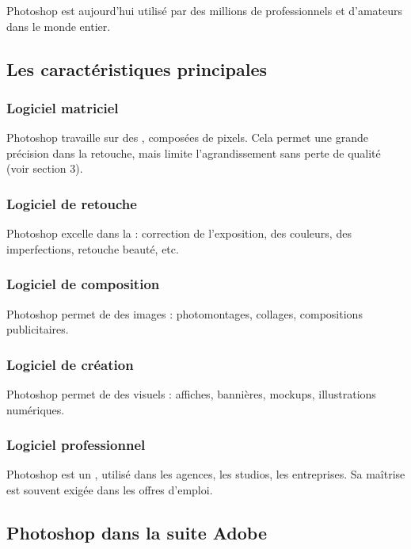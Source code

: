 Photoshop est aujourd'hui utilisé par des millions de professionnels et d'amateurs dans le monde entier.

\subsection{Les caractéristiques principales}

\subsubsection{Logiciel matriciel}

Photoshop travaille sur des , composées de pixels. Cela permet une grande précision dans la retouche, mais limite l'agrandissement sans perte de qualité (voir section 3).

\subsubsection{Logiciel de retouche}

Photoshop excelle dans la  : correction de l'exposition, des couleurs, des imperfections, retouche beauté, etc.

\subsubsection{Logiciel de composition}

Photoshop permet de  des images : photomontages, collages, compositions publicitaires.

\subsubsection{Logiciel de création}

Photoshop permet de  des visuels : affiches, bannières, mockups, illustrations numériques.

\subsubsection{Logiciel professionnel}

Photoshop est un , utilisé dans les agences, les studios, les entreprises. Sa maîtrise est souvent exigée dans les offres d'emploi.

\subsection{Photoshop dans la suite Adobe}

